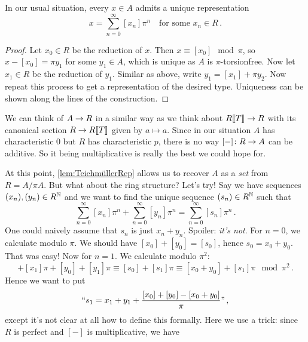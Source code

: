 \documentclass[a4paper, 10pt, oneside, DIV=9, chapterprefix=true, numbers=enddot,bibliography=totoc]{scrbook}
\begin{document}
\begin{lem}\label{lem:TeichmüllerRep}
	In our usual situation, every $x\in A$ admits a unique representation
	\begin{equation*}
		x=\sum_{n=0}^{\infty}[x_n]\pi^n\quad\text{for some }x_n\in R\,.
	\end{equation*}
\end{lem}
\begin{proof}
	Let $x_0\in R$ be the reduction of $x$. Then $x\equiv[x_0]\mod \pi$, so $x-[x_0]=\pi y_1$ for some $y_1\in A$, which is unique as $A$ is $\pi$-torsionfree. Now let $x_1\in R$ be the reduction of $y_1$. Similar as above, write $y_1=[x_1]+\pi y_2$. Now repeat this process to get a representation of the desired type. Uniqueness can be shown along the lines of the construction.
\end{proof}
\begin{urem}
	We can think of $A\morphism R$ in a similar way as we think about $R\llbracket T\rrbracket\morphism R$ with its canonical section $R\morphism R\llbracket T\rrbracket$ given by $a\mapsto a$. Since in our situation $A$ has characteristic $0$ but $R$ has characteristic $p$, there is no way $[-]\colon R\morphism A$ can be additive. So it being multiplicative is really the best we could hope for.
\end{urem}
At this point, \cref{lem:TeichmüllerRep} allows us to recover $A$ as a \emph{set} from $R=A/\pi A$. But what about the ring structure? Let's try! Say we have sequences $(x_n),(y_n)\in R^{\mathbb{N}}$ and we want to find the unique sequence $(s_n)\in R^{\mathbb{N}}$ such that
\begin{equation*}
	\sum_{n=0}^{\infty}[x_n]\pi^n+\sum_{n=0}^{\infty}[y_n]\pi^n=\sum_{n=0}^\infty [s_n]\pi^n\,.
\end{equation*}
One could naively assume that $s_n$ is just $x_n+y_n$. Spoiler: \emph{it's not}. For $n=0$, we calculate modulo $\pi$. We should have $[x_0]+[y_0]=[s_0]$, hence $s_0=x_0+y_0$. That was easy! Now for $n=1$. We calculate modulo $\pi^2$:
\begin{equation*}
	[x_0]+[x_1]\pi+[y_0]+[y_1]\pi\equiv [s_0]+[s_1]\pi\equiv [x_0+y_0]+[s_1]\pi\mod \pi^2\,.
\end{equation*}
Hence we want to put
\begin{equation*}
	``s_1=x_1+y_1+\frac{[x_0]+[y_0]-[x_0+y_0]}{\pi}\text{''}\,,
\end{equation*}
except it's not clear at all how to define this formally. Here we use a trick: since $R$ is perfect and $[-]$ is multiplicative, we have
\end{document}
